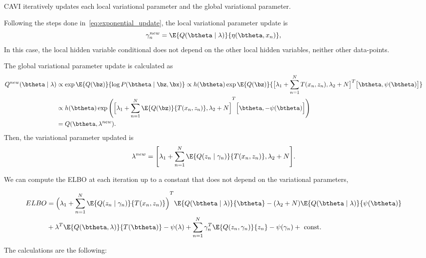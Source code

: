 CAVI iteratively updates each local variational parameter and the global variational parameter.

Following the steps done in~\ref{eq:exponential_update}, the local variational parameter update is
\[
  \gamma_{n}^{new} = \E{Q(\btheta \mid \lambda)}{\eta(\btheta, x_{n})},
\]
In this case, the local hidden variable conditional does not depend on the other local hidden variables, neither other data-points.

The global variational parameter update is calculated as
\[
  \begin{aligned}
    Q^{new}(\btheta \mid \lambda) &\propto \exp \E{Q(\bz)}{\log P(\btheta \mid \bz , \bx)} \propto h(\btheta) \exp \E{Q(\bz)}{\big[  \lambda_{1} + \sum_{n=1}^{N}T(x_{n}, z_{n}), \lambda_{2} + N \big]^{T}\big[ \btheta, \psi(\btheta) \big]}\\
    &\propto h(\btheta) \exp \Bigg( {\Big[  \lambda_{1} + \sum_{n=1}^{N}\E{Q(\bz)}{T(x_{n}, z_{n})}, \lambda_{2} + N \Big]}^{T}\Big[ \btheta, - \psi(\btheta) \Big]\Bigg)\\
    &= Q(\btheta, \lambda^{new}).
  \end{aligned}
\]
Then, the variational parameter updated is
\[
  \lambda^{new} = \Bigg[ \lambda_{1} + \sum_{n=1}^{N} \E{Q(z_{n}\mid \gamma_{n})}{T(x_{n},z_{n})}, \lambda_{2} + N \Bigg].
\]

We can compute the ELBO at each iteration up to a constant that does not depend on the variational parameters,

\[
  \begin{aligned}
    ELBO &= {\Big( \lambda_{1} + \sum_{n=1}^{N} \E{Q(z_{n}\mid \gamma_{n})}{T(x_{n},z_{n})}\Big)}^{T}\E{Q(\btheta \mid \lambda)}{\btheta} - (\lambda_{2} + N) \E{Q(\btheta \mid \lambda)}{\psi(\btheta)}\\
    &+ \lambda ^{T} \E{Q(\btheta, \lambda)}{T(\btheta)} - \psi(\lambda) + \sum_{n=1}^{N}\gamma_{n}^{T}\E{Q(z_{n}, \gamma_{n})}{z_{n}} - \psi(\gamma_{n}) + \text{ const. }
  \end{aligned}
\]

The calculations are the following:

